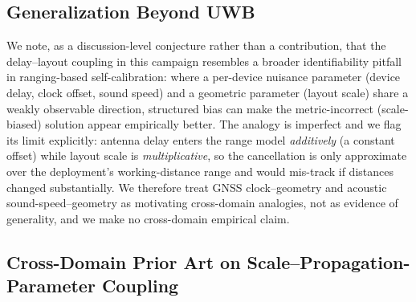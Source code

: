 \documentclass[11pt,a4paper]{article}
\begin{document}
\subsection{Generalization Beyond UWB}

We note, as a discussion-level conjecture rather than a contribution, that the
delay--layout coupling in this campaign resembles a broader identifiability pitfall in
ranging-based self-calibration: where a per-device nuisance parameter (device delay,
clock offset, sound speed) and a geometric parameter (layout scale) share a weakly
observable direction, structured bias can make the metric-incorrect (scale-biased) solution appear
empirically better. The analogy is imperfect and we flag its limit explicitly: antenna
delay enters the range model \emph{additively} (a constant offset) while layout scale
is \emph{multiplicative}, so the cancellation is only approximate over the deployment's
working-distance range and would mis-track if distances changed substantially. We
therefore treat GNSS clock--geometry and acoustic sound-speed--geometry as motivating
cross-domain analogies, not as evidence of generality, and we make no cross-domain
empirical claim.

\subsection{Cross-Domain Prior Art on Scale--Propagation-Parameter Coupling}
\end{document}
